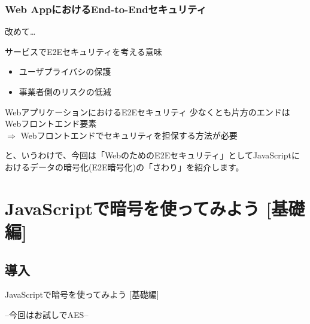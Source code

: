 \documentclass[12pt,dvipdfmx]{beamer}
\begin{document}
\begin{frame}
\frametitle{Web AppにおけるEnd-to-Endセキュリティ}
改めて…
\begin{block}{\small サービスでE2Eセキュリティを考える意味}
\begin{itemize}
 \item ユーザプライバシの保護
 \item 事業者側のリスクの低減
\end{itemize}
\end{block}

\begin{exampleblock}{\small WebアプリケーションにおけるE2Eセキュリティ}
少なくとも片方のエンドはWebフロントエンド要素\\
$\Rightarrow$ \alert{Webフロントエンドでセキュリティを担保する方法が必要}
\end{exampleblock}

\end{frame}

\begin{frame}
と、いうわけで、今回は「WebのためのE2Eセキュリティ」としてJavaScriptにおけるデータの暗号化(E2E暗号化)の「さわり」を紹介します。
\end{frame}

\section{JavaScriptで暗号を使ってみよう [基礎編]}

\subsection{導入}
\begin{frame}
\centering
{\Large JavaScriptで暗号を使ってみよう [基礎編]}

\vspace{1ex}
--今回はお試しでAES--

\end{frame}
\end{document}
